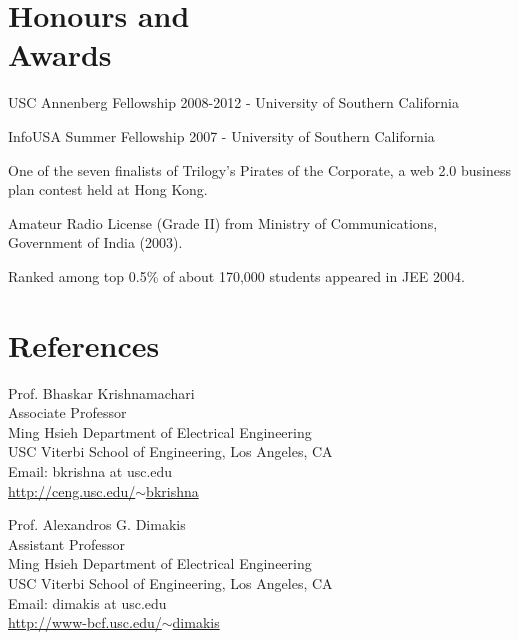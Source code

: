 \documentclass[margin,line]{resume}
\begin{document}
\begin{resume}
\section{\mysidestyle Honours and\\Awards} 
\begin{list2}
	  \item USC Annenberg Fellowship 2008-2012	- University of Southern California
          \item InfoUSA Summer Fellowship 2007	- University of Southern California %
	  \item One of the seven finalists of Trilogy's Pirates of the Corporate, a web 2.0 business plan contest held at Hong Kong. %
	  \item Amateur Radio License (Grade II) from Ministry of Communications, Government of India (2003).%
	  \item Ranked among top 0.5\% of about 170,000 students appeared in JEE 2004. \\%
\end{list2}
  



\section{\mysidestyle References} 
Prof. Bhaskar Krishnamachari \\
Associate Professor \\
Ming Hsieh Department of Electrical Engineering \\
USC Viterbi School of Engineering, Los Angeles, CA \\
Email: bkrishna at usc.edu \\
\href{http://ceng.usc.edu/~bkrishna}{http://ceng.usc.edu/$\sim$bkrishna}

Prof. Alexandros G. Dimakis \\
Assistant Professor \\
Ming Hsieh Department of Electrical Engineering \\
USC Viterbi School of Engineering, Los Angeles, CA \\
Email: dimakis at usc.edu \\
\href{http://www-bcf.usc.edu/~dimakis}{http://www-bcf.usc.edu/$\sim$dimakis}

\end{resume}
\end{document}
